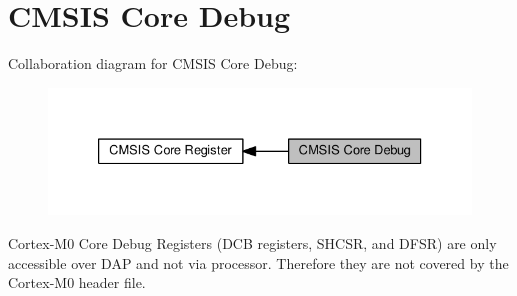 \hypertarget{group___c_m_s_i_s___core_debug}{}\section{C\+M\+S\+IS Core Debug}
\label{group___c_m_s_i_s___core_debug}
Collaboration diagram for C\+M\+S\+IS Core Debug\+:\nopagebreak
\begin{figure}[H]
\begin{center}
\leavevmode
\includegraphics[width=333pt]{group___c_m_s_i_s___core_debug}
\end{center}
\end{figure}
Cortex-\/\+M0 Core Debug Registers (D\+CB registers, S\+H\+C\+SR, and D\+F\+SR) are only accessible over D\+AP and not via processor. Therefore they are not covered by the Cortex-\/\+M0 header file. 